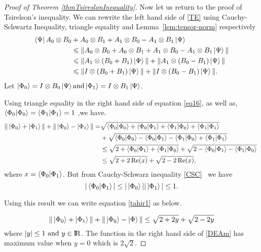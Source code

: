 \begin{proof}[Proof of Theorem \ref{thmTsireslonInequality}]
Now  let us return to the proof of  Tsirelson’s inequality. We can rewrite the left hand side of \ref{TE} using Cauchy-Schwartz Inequality, triangle equality and Lemma~\ref{lem:tensor-norm} respectively
\begin{align}
\bra{\Psi}A_0\otimes B_0 &+ A_0\otimes B_1+A_1\otimes B_0 -A_1\otimes B_1\ket{\Psi} \\
&\leqslant  \| A_0\otimes B_0+ A_0\otimes B_1+A_1\otimes B_0 -A_1\otimes B_1\ket{\Psi}\| \nonumber\\
&\leqslant \| A_1\otimes (B_0+ B_1)\ket{\Psi}\| +\| A_1\otimes( B_0 - B_1)\ket{\Psi}\|\nonumber \\
&\leqslant \| I\otimes (B_0+ B_1)\ket{\Psi}\| +\| I\otimes( B_0 - B_1)\ket{\Psi}\|\label{eq16}.
\end{align}
Let $\ket{\Phi_0}=I\otimes B_0\ket{\Psi} \text{and}\ket{\Phi_1}=I\otimes B_1\ket{\Psi}$.

Using triangle equality in the right hand side of equation \ref{eq16}, as well as, $\bra{\Phi_0}\ket{\Phi_0}=\bra{\Phi_1}\ket{\Phi_1} =1$ ,we have.
\begin{align}
\| \ket{\Phi_0}+ \ket{\Phi_1}\| +\| \ket{\Phi_0}- \ket{\Phi_1}\| = &\sqrt{\bra{\Phi_0}\ket{\Phi_0}+\bra{\Phi_0}\ket{\Phi_1}+\bra{\Phi_1}\ket{\Phi_0}+\bra{\Phi_1}\ket{\Phi_1}}\nonumber\\
&+\sqrt{\bra{\Phi_0}\ket{\Phi_0}-\bra{\Phi_0}\ket{\Phi_1}-\bra{\Phi_1}\ket{\Phi_0}+\bra{\Phi_1}\ket{\Phi_1}}\nonumber\\
 &\leq \sqrt{2+\bra{\Phi_0}\ket{\Phi_1}+\bra{\Phi_1}\ket{\Phi_0}}+\sqrt{2-\bra{\Phi_0}\ket{\Phi_1}-\bra{\Phi_1}\ket{\Phi_0}}\
\nonumber\\
&\leq \sqrt{2+2\Re(x)}+\sqrt{2-2\Re(x)}\label{tahir1},
\end{align} 
where $x= \bra{\Phi_0}\ket{\Phi_1}$. But from  Cauchy-Schwarz inequality \ref{CSC}~ we have 
\begin{equation}\label{REE}
|\bra{\Phi_0}\ket{\Phi_1}|\leq |\ket{\Phi_0}||\ket{\Phi_1}|\leq 1.
\end{equation}


Using this result we can write equation \ref{tahir1} as below.

\begin{equation}\label{DEAm}
\| \ket{\Phi_0}+ \ket{\Phi_1}\| +\| \ket{\Phi_0}- \ket{\Phi}\| \leq \sqrt{2+2y}+\sqrt{2-2y}
\end{equation} 
where $|y|\leq 1 \text{ and } y\in {\rm I\!R}$. The function  in the right hand side of \ref{DEAm} has maximum value  when $y=0$ which is $2\sqrt{2}$.

\end{proof}

